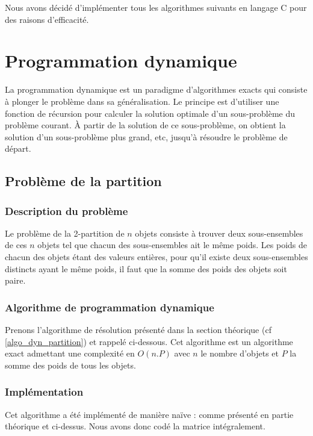 

Nous avons décidé d'implémenter tous les algorithmes suivants en langage C pour des raisons d'efficacité.

\section{Programmation dynamique}
La programmation dynamique est un paradigme d'algorithmes exacts qui consiste à plonger le problème dans sa généralisation. Le principe est d'utiliser une fonction de récursion pour calculer la solution optimale d'un sous-problème du problème courant. À partir de la solution de ce sous-problème, on obtient la solution d'un sous-problème plus grand, etc, jusqu'à résoudre le problème de départ.


\subsection{Problème de la partition}

\subsubsection{Description du problème}
Le problème de la 2-partition de $n$ objets consiste à trouver deux sous-ensembles de ces $n$ objets tel que chacun des sous-ensembles ait le même poids. Les poids de chacun des objets étant des valeurs entières, pour qu’il existe deux sous-ensembles distincts ayant le même poids, il faut que la somme des poids des objets soit paire.

\subsubsection{Algorithme de programmation dynamique}
Prenons l'algorithme de résolution présenté dans la section théorique (cf \ref{algo_dyn_partition}) et rappelé ci-dessous. Cet algorithme est un algorithme exact admettant une complexité en $O(n.P)$ avec $n$ le nombre d'objets et $P$ la somme des poids de tous les objets.



\subsubsection{Implémentation}
Cet algorithme a été implémenté de manière naïve : comme présenté en partie théorique et ci-dessus.
Nous avons donc codé la matrice intégralement.

